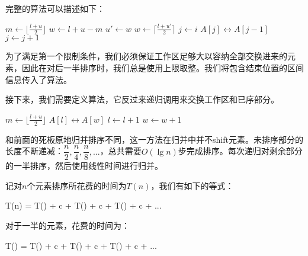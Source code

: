 \documentclass{ctexart}
\begin{document}
完整的算法可以描述如下：

\begin{algorithmic}[1]
    \State $m \gets \lfloor \frac{l + u}{2} \rfloor$
    \State $w \gets l + u - m$
    \State {} 
      \State $u' \gets w$
      \State $w \gets \lceil \frac{l + u'}{2} \rceil$ 
      \State {} 
      \State {}
    \EndWhile
     
      \State $j \gets i$
        \State {} $A[j] \leftrightarrow A[j-1]$
        \State $j \gets j + 1$
      \EndWhile
    \EndFor
  \EndIf
\EndProcedure
\end{algorithmic}

为了满足第一个限制条件，我们必须保证工作区足够大以容纳全部交换进来的元素，因此在对后一半排序时，我们总是使用上限取整。我们将包含结束位置的区间信息传入了算法。

接下来，我们需要定义算法，它反过来递归调用来交换工作区和已序部分。

\begin{algorithmic}[1]
    \State $m \gets \lfloor \frac{l + u}{2} \rfloor$
    \State {}
    \State {}
    \State {}
  \Else {}
      \State {} $A[l] \leftrightarrow A[w]$
      \State $l \gets l + 1$
      \State $w \gets w + 1$
    \EndWhile
  \EndIf
\EndProcedure
\end{algorithmic}

和前面的死板原地归并排序不同，这一方法在归并中并不shift元素。未排序部分的长度不断递减：$\dfrac{n}{2}, \dfrac{n}{4}, \dfrac{n}{8}, ...$，总共需要$O(\lg n)$步完成排序。每次递归对剩余部分的一半排序，然后使用线性时间进行归并。

记对$n$个元素排序所花费的时间为$T(n)$，我们有如下的等式：

\be
T(n) = T() + c  + T() + c  + T() + c  + ...
\label{eq:in-place-sort-time}
\ee

对于一半的元素，花费的时间为：

\be
T() = T() + c  + T() + c  + T() + c  + ...
\label{eq:in-place-sort-time-half}
\ee
\end{document}
